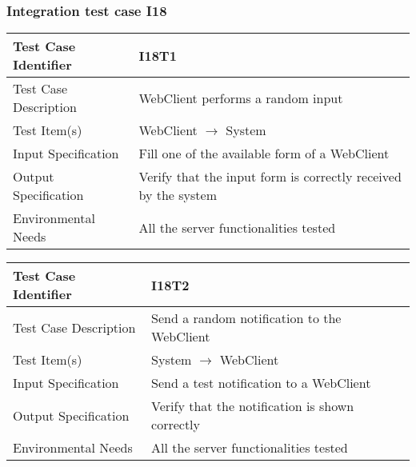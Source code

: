 		\subsubsection{Integration test case I18}
		\begin{center}
			\begin{tabular}{ |l p{10cm}| } \hline
				Test Case Identifier & I18T1\\ \hline
				Test Case Description & WebClient performs a random input  \\ \hline
				Test Item(s) & WebClient $\rightarrow$ System \\ \hline
				Input Specification & Fill one of the available form of a WebClient \\ \hline
				Output Specification & Verify that the input form is correctly received by the system \\ \hline
				Environmental Needs & All the server functionalities tested \\ \hline
			\end{tabular}
		\end{center}
		\begin{center}
			\begin{tabular}{ |l p{10cm}| } \hline
				Test Case Identifier & I18T2 \\ \hline
				Test Case Description & Send a random notification to the WebClient \\ \hline
				Test Item(s) & System $\rightarrow$ WebClient \\ \hline
				Input Specification & Send a test notification to a WebClient \\ \hline
				Output Specification & Verify that the notification is shown correctly \\ \hline
				Environmental Needs & All the server functionalities tested \\ \hline
			\end{tabular}
		\end{center}
